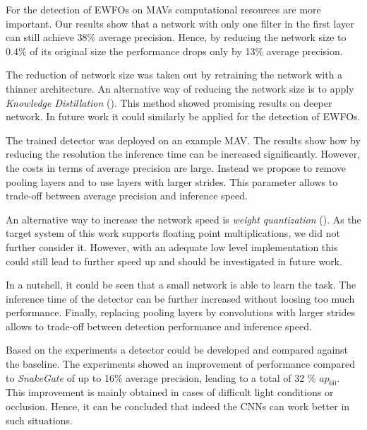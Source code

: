 \begin{enumerate}
	For the detection of \acp{EWFO} on \acp{MAV} computational resources are more important. Our results show that a network with only one filter in the first layer can still achieve 38\% average precision. Hence, by reducing the network size to 0.4\% of its original size the performance drops only by 13\% average precision.
	
	The reduction of network size was taken out by retraining the network with a thinner architecture. An alternative way of reducing the network size is to apply \textit{Knowledge Distillation} (). This method showed promising results on deeper network. In future work it could similarly be applied for the detection of \acp{EWFO}.
	
	The trained detector was deployed on an example \ac{MAV}. The results show how by reducing the resolution the inference time can be increased significantly. However, the costs in terms of average precision are large. Instead we propose to remove pooling layers and to use layers with larger strides. This parameter allows to trade-off between average precision and inference speed. 
	
	An alternative way to increase the network speed is \textit{weight quantization} (). As the target system of this work supports floating point multiplications, we did not further consider it. However, with an adequate low level implementation this could still lead to further speed up and should be investigated in future work.
	
	In a nutshell, it could be seen that a small network is able to learn the task. The inference time of the detector can be further increased without loosing too much performance. Finally, replacing pooling layers by convolutions with larger strides allows to trade-off between detection performance and inference speed.
		
\end{enumerate}


Based on the experiments a detector could be developed and compared against the baseline. The experiments showed an improvement of performance compared to \textit{SnakeGate} of up to 16\% average precision, leading to a total of 32 \% $ap_{60}$. This improvement is mainly obtained in cases of difficult light conditions or occlusion. Hence, it can be concluded that indeed the \acp{CNN} can work better in such situations.


